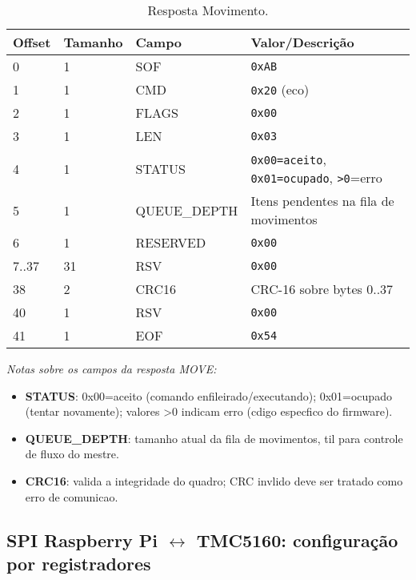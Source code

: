 \begin{table}[H]
  \centering
  \caption{Resposta Movimento.}
  \label{tab:spi-move-rsp}
  \setlength{\tabcolsep}{4pt}\footnotesize
  \begin{tabularx}{\textwidth}{lllX}
    \toprule
    Offset & Tamanho & Campo & Valor/Descri\c{c}\~ao \\
    \midrule
    0 & 1 & SOF & \texttt{0xAB} \\
    1 & 1 & CMD & \texttt{0x20} (eco) \\
    2 & 1 & FLAGS & \texttt{0x00} \\
    3 & 1 & LEN & \texttt{0x03} \\
    4 & 1 & STATUS & \texttt{0x00=aceito}, \texttt{0x01=ocupado}, \texttt{\textgreater 0}=erro \\
    5 & 1 & QUEUE\_DEPTH & Itens pendentes na fila de movimentos \\
    6 & 1 & RESERVED & \texttt{0x00} \\
    7..37 & 31 & RSV & \texttt{0x00} \\
    38 & 2 & CRC16 & CRC-16 sobre bytes 0..37 \\
    40 & 1 & RSV & \texttt{0x00} \\
    41 & 1 & EOF & \texttt{0x54} \\
    \bottomrule
  \end{tabularx}
\end{table}

\vspace{2mm}
\noindent\footnotesize\textit{Notas sobre os campos da resposta MOVE:}
\begin{itemize}
  \item \textbf{STATUS}: 0x00=aceito (comando enfileirado/executando); 0x01=ocupado (tentar novamente); valores \textgreater 0 indicam erro (cdigo especfico do firmware).
  \item \textbf{QUEUE\_DEPTH}: tamanho atual da fila de movimentos, til para controle de fluxo do mestre.
  \item \textbf{CRC16}: valida a integridade do quadro; CRC invlido deve ser tratado como erro de comunicao.
\end{itemize}

\FloatBarrier

\FloatBarrier

\subsection*{SPI Raspberry Pi \texorpdfstring{$\leftrightarrow$}{<->} TMC5160: configuração por registradores}

